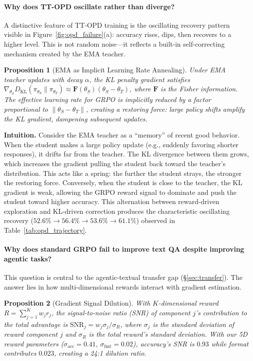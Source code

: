 \documentclass{article}
\newtheorem{proposition}{Proposition}[section]
\begin{document}
\paragraph{Why does TT-OPD oscillate rather than diverge?}
A distinctive feature of TT-OPD training is the oscillating recovery pattern visible in Figure~\ref{fig:opd_failure}(a): accuracy rises, dips, then recovers to a higher level. This is not random noise---it reflects a built-in self-correcting mechanism created by the EMA teacher.

\begin{proposition}[EMA as Implicit Learning Rate Annealing]
\label{prop:oscillation}
Under EMA teacher updates with decay $\alpha$, the KL penalty gradient satisfies $\nabla_{\theta_S} D_{\mathrm{KL}}(\pi_{\theta_S} \| \pi_{\theta_T}) \approx \mathbf{F}(\theta_S)(\theta_S - \theta_T)$, where $\mathbf{F}$ is the Fisher information. The effective learning rate for GRPO is implicitly reduced by a factor proportional to $\|\theta_S - \theta_T\|$, creating a restoring force: large policy shifts amplify the KL gradient, dampening subsequent updates.
\end{proposition}

\noindent\textbf{Intuition.} Consider the EMA teacher as a ``memory'' of recent good behavior. When the student makes a large policy update (e.g., suddenly favoring shorter responses), it drifts far from the teacher. The KL divergence between them grows, which increases the gradient pulling the student back toward the teacher's distribution. This acts like a spring: the further the student strays, the stronger the restoring force. Conversely, when the student is close to the teacher, the KL gradient is weak, allowing the GRPO reward signal to dominate and push the student toward higher accuracy. This alternation between reward-driven exploration and KL-driven correction produces the characteristic oscillating recovery ($52.6\% \to 56.4\% \to 53.6\% \to 61.1\%$) observed in Table~\ref{tab:opd_trajectory}.

\paragraph{Why does standard GRPO fail to improve text QA despite improving agentic tasks?}
This question is central to the agentic-textual transfer gap (\S\ref{sec:transfer}). The answer lies in how multi-dimensional rewards interact with gradient estimation.

\begin{proposition}[Gradient Signal Dilution]
\label{prop:dilution}
With $K$-dimensional reward $R = \sum_{j=1}^K w_j r_j$, the signal-to-noise ratio (SNR) of component $j$'s contribution to the total advantage is $\mathrm{SNR}_j = w_j\sigma_j / \sigma_R$, where $\sigma_j$ is the standard deviation of reward component $j$ and $\sigma_R$ is the total reward's standard deviation. With our 5D reward parameters ($\sigma_\mathrm{acc}{=}0.41$, $\sigma_\mathrm{fmt}{=}0.02$), accuracy's SNR is $0.93$ while format contributes $0.023$, creating a 24:1 dilution ratio.
\end{proposition}
\end{document}
